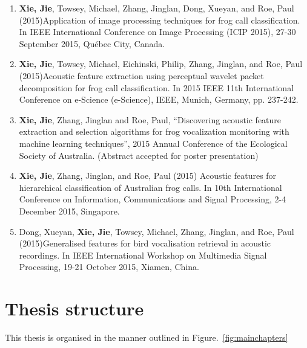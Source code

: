 \begin{enumerate}
\item	\textbf{Xie, Jie}, Towsey, Michael, Zhang, Jinglan, Dong, Xueyan, and Roe, Paul (2015)Application of image processing techniques for frog call classification. In IEEE International Conference on Image Processing (ICIP 2015), 27-30 September 2015, Québec City, Canada.

\item	\textbf{Xie, Jie}, Towsey, Michael, Eichinski, Philip, Zhang, Jinglan, and Roe, Paul (2015)Acoustic feature extraction using perceptual wavelet packet decomposition for frog call classification. In 2015 IEEE 11th International Conference on e-Science (e-Science), IEEE, Munich, Germany, pp. 237-242.

\item	\textbf{Xie, Jie}, Zhang, Jinglan and Roe, Paul,  “Discovering acoustic feature extraction and selection algorithms for frog vocalization monitoring with machine learning techniques”, 2015 Annual Conference of the Ecological Society of Australia. (Abstract accepted for poster presentation) 

\item	\textbf{Xie, Jie}, Zhang, Jinglan, and Roe, Paul (2015) Acoustic features for hierarchical classification of Australian frog calls. In 10th International Conference on Information, Communications and Signal Processing, 2-4 December 2015, Singapore.

\item	Dong, Xueyan, \textbf{Xie, Jie}, Towsey, Michael, Zhang, Jinglan, and Roe, Paul (2015)Generalised features for bird vocalisation retrieval in acoustic recordings. In IEEE International Workshop on Multimedia Signal Processing, 19-21 October 2015, Xiamen, China.

\end{enumerate} 




 
 
\section{Thesis structure} 
 
This thesis is organised in the manner outlined in Figure.~\ref{fig:mainchapters}

